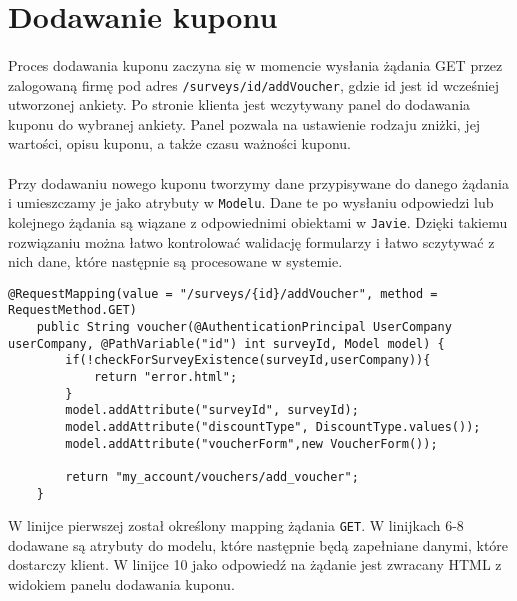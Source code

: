\section{Dodawanie kuponu}
\paragraph{}
Proces dodawania kuponu zaczyna się w momencie wysłania żądania GET przez zalogowaną firmę pod adres \texttt{/surveys/{id}/addVoucher}, gdzie {id} jest id wcześniej utworzonej ankiety. Po stronie klienta jest wczytywany panel do dodawania kuponu do wybranej ankiety. Panel pozwala na ustawienie rodzaju zniżki, jej wartości, opisu kuponu, a także czasu ważności kuponu.

\paragraph{}
Przy dodawaniu nowego kuponu tworzymy dane przypisywane do danego żądania i umieszczamy je jako atrybuty w \texttt{Modelu}. Dane te po wysłaniu odpowiedzi lub kolejnego żądania są wiązane z odpowiednimi obiektami w \texttt{Javie}. Dzięki takiemu rozwiązaniu można łatwo kontrolować walidację formularzy i łatwo sczytywać z nich dane, które następnie są procesowane w systemie.

\begin{center}
\begin{lstlisting}[caption={Listing kodu wywoływanego przy otrzymaniu żądania GET dla dodawania kuponu.},captionpos=b]
@RequestMapping(value = "/surveys/{id}/addVoucher", method = RequestMethod.GET)
    public String voucher(@AuthenticationPrincipal UserCompany userCompany, @PathVariable("id") int surveyId, Model model) {
        if(!checkForSurveyExistence(surveyId,userCompany)){
            return "error.html";
        }
        model.addAttribute("surveyId", surveyId);
        model.addAttribute("discountType", DiscountType.values());
        model.addAttribute("voucherForm",new VoucherForm());

        return "my_account/vouchers/add_voucher";
    }
\end{lstlisting}
\end{center}

W linijce pierwszej został określony mapping żądania \texttt{GET}. W linijkach 6-8 dodawane są atrybuty do modelu, które następnie będą zapełniane danymi, które dostarczy klient. W linijce 10 jako odpowiedź na żądanie jest zwracany HTML z widokiem panelu dodawania kuponu.

